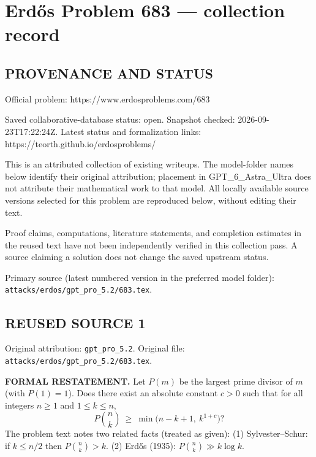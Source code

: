\section*{Erd\H{o}s Problem 683 --- collection record}

\subsection*{PROVENANCE AND STATUS}
Official problem: https://www.erdosproblems.com/683

Saved collaborative-database status: open.
Snapshot checked: 2026-09-23T17:22:24Z.
Latest status and formalization links: https://teorth.github.io/erdosproblems/

This is an attributed collection of existing writeups. The model-folder names below identify their original attribution; placement in GPT\_6\_Astra\_Ultra does not attribute their mathematical work to that model. All locally available source versions selected for this problem are reproduced below, without editing their text.

Proof claims, computations, literature statements, and completion estimates in the reused text have not been independently verified in this collection pass. A source claiming a solution does not change the saved upstream status.

Primary source (latest numbered version in the preferred model folder): \texttt{attacks/erdos/gpt\_pro\_5.2/683.tex}.

\subsection*{REUSED SOURCE 1}
Original attribution: \texttt{gpt\_pro\_5.2}.
Original file: \texttt{attacks/erdos/gpt\_pro\_5.2/683.tex}.

\item
\textbf{FORMAL RESTATEMENT.}
Let $P(m)$ be the largest prime divisor of $m$ (with $P(1)=1$).
Does there exist an absolute constant $c>0$ such that for all integers $n\ge1$ and $1\le k\le n$,
\[
P\!\binom{n}{k}\ \ge\ \min\bigl(n-k+1,\ k^{1+c}\bigr)?
\]
The problem text notes two related facts (treated as given):
(1) Sylvester--Schur: if $k\le n/2$ then $P\!\binom{n}{k}>k$.
(2) Erd\H{o}s (1935): $P\!\binom{n}{k} \gg k\log k$.

